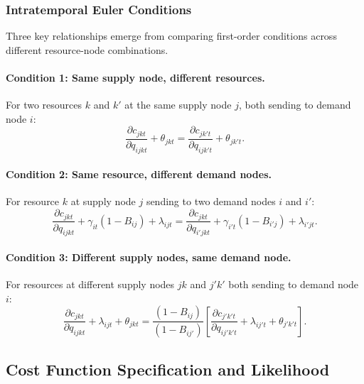 \documentclass[12pt]{article}
\begin{document}
\subsubsection{Intratemporal Euler Conditions}

Three key relationships emerge from comparing first-order conditions across different resource-node combinations.

\paragraph{Condition 1: Same supply node, different resources.} For two resources $k$ and $k'$ at the same supply node $j$, both sending to demand node $i$:
\begin{equation}\label{eq:euler1}
    \frac{\partial c_{jkt}}{\partial q_{ijkt}} + \theta_{jkt} = \frac{\partial c_{jk't}}{\partial q_{ijk't}} + \theta_{jk't}.
\end{equation}

\paragraph{Condition 2: Same resource, different demand nodes.} For resource $k$ at supply node $j$ sending to two demand nodes $i$ and $i'$:
\begin{equation}\label{eq:euler2}
    \frac{\partial c_{jkt}}{\partial q_{ijkt}} + \gamma_{it}(1 - B_{ij}) + \lambda_{ijt} = \frac{\partial c_{jkt}}{\partial q_{i'jkt}} + \gamma_{i't}(1 - B_{i'j}) + \lambda_{i'jt}.
\end{equation}

\paragraph{Condition 3: Different supply nodes, same demand node.} For resources at different supply nodes $jk$ and $j'k'$ both sending to demand node $i$:
\begin{equation}\label{eq:euler3}
    \frac{\partial c_{jkt}}{\partial q_{ijkt}} + \lambda_{ijt} + \theta_{jkt} = \frac{(1 - B_{ij})}{(1 - B_{ij'})} \left[\frac{\partial c_{j'k't}}{\partial q_{ij'k't}} + \lambda_{ij't} + \theta_{j'k't}\right].
\end{equation}

\subsection{Cost Function Specification and Likelihood}\label{app:likelihood}
\end{document}
